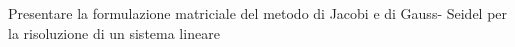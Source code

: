 Presentare la formulazione matriciale del metodo di Jacobi e di Gauss- Seidel per la risoluzione di un sistema lineare
